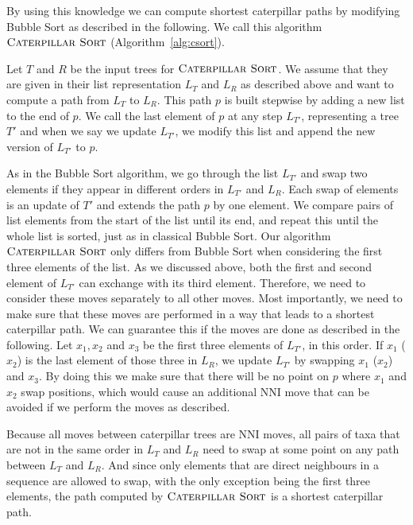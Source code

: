 \documentclass{amsart}
\newcommand{\nni}{\mathrm{NNI}}
\newcommand{\csort}{\textsc{Caterpillar Sort}}
\begin{document}
By using this knowledge we can compute shortest caterpillar paths by modifying Bubble Sort as described in the following.
We call this algorithm $\csort$ (Algorithm~\ref{alg:csort}).

Let $T$ and $R$ be the input trees for $\csort$.
We assume that they are given in their list representation $L_T$ and $L_R$ as described above and want to compute a path from $L_T$ to $L_R$.
This path $p$ is built stepwise by adding a new list to the end of $p$.
We call the last element of $p$ at any step $L_{T'}$, representing a tree $T'$ and when we say we update $L_{T'}$, we modify this list and append the new version of $L_{T'}$ to $p$.

As in the Bubble Sort algorithm, we go through the list $L_{T'}$ and swap two elements if they appear in different orders in $L_{T'}$ and $L_R$.
Each swap of elements is an update of $T'$ and extends the path $p$ by one element.
We compare pairs of list elements from the start of the list until its end, and repeat this until the whole list is sorted, just as in classical Bubble Sort.
Our algorithm $\csort$ only differs from Bubble Sort when considering the first three elements of the list.
As we discussed above, both the first and second element of $L_{T'}$ can exchange with its third element.
Therefore, we need to consider these moves separately to all other moves.
Most importantly, we need to make sure that these moves are performed in a way that leads to a shortest caterpillar path.
We can guarantee this if the moves are done as described in the following.
Let $x_1, x_2$ and $x_3$ be the first three elements of $L_{T'}$, in this order.
If $x_1$ ($x_2$) is the last element of those three in $L_R$, we update $L_{T'}$ by swapping $x_1$ ($x_2$) and $x_3$.
By doing this we make sure that there will be no point on $p$ where $x_1$ and $x_2$ swap positions, which would cause an additional $\nni$ move that can be avoided if we perform the moves as described.

Because all moves between caterpillar trees are $\nni$ moves, all pairs of taxa that are not in the same order in $L_T$ and $L_R$ need to swap at some point on any path between $L_T$ and $L_R$.
And since only elements that are direct neighbours in a sequence are allowed to swap, with the only exception being the first three elements, the path computed by $\csort$ is a shortest caterpillar path.
\end{document}
